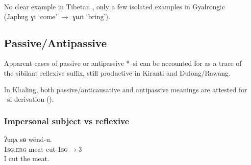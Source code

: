 \documentclass[oldfontcommands,oneside,a4paper,11pt]{article}
\newcommand{\ipa}[1]{{\phon \mbox{#1}}} %
\newcommand{\zh}[1]{{\cn #1}}
\begin{document}
No clear example in Tibetan \citet[630]{hill14derivational}, only a few isolated examples in Gyalrongic (Japhug \ipa{ɣi} `come' $\rightarrow$ \ipa{ɣɯt} `bring'). 
%
%
%
%
%

\subsection{Passive/Antipassive}
Apparent cases of passive or antipassive *\ipa{--si} can be accounted for as a trace of the sibilant reflexive suffix, still productive in Kiranti and Dulong/Rawang.

In Khaling, both passive/anticausative and antipassive meanings are attested for \ipa{--si} derivation (\citealt{jacques16si}).
\subsubsection{Impersonal subject vs reflexive} 

\begin{exe}
\ex \label{ex:wendu} 
\gll 
\ipa{ʔuŋʌ}  	\ipa{sɵ}  	\ipa{wēnd-u.}  \\
\textsc{1sg:erg} meat cut-\textsc{1sg$\rightarrow$3} \\
\glt I cut the meat.
\end{exe}
\end{document}

